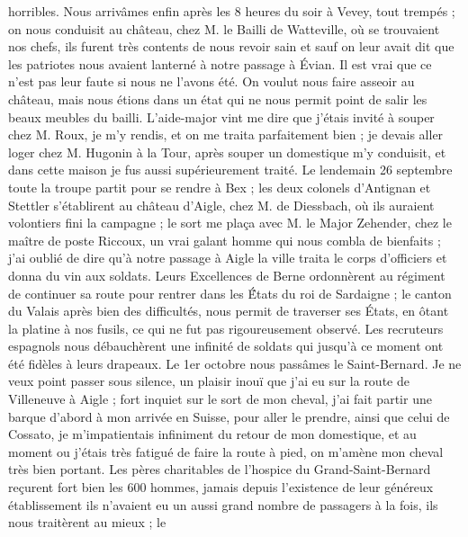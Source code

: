 \documentclass[12pt]{article}
\begin{document}
 horribles. Nous arrivâmes enfin après les 8 heures du
soir à Vevey, tout trempés ; on nous conduisit au château, chez M. le Bailli de Watteville, où se
trouvaient nos chefs, ils furent très contents de nous revoir sain et sauf on leur avait dit que les
patriotes nous avaient lanterné à notre passage à Évian. Il est vrai que ce n’est pas leur faute si
nous ne l’avons été. On voulut nous faire asseoir au château, mais nous étions dans un état qui ne
nous permit point de salir les beaux meubles du bailli. L’aide-major vint me dire que j’étais invité
à souper chez M. Roux, je m’y rendis, et on me traita parfaitement bien ; je devais aller loger chez
M. Hugonin à la Tour, après souper un domestique m’y conduisit, et dans cette maison je fus aussi
supérieurement traité. Le lendemain 26 septembre toute la troupe partit pour se rendre à Bex ; les
deux colonels d’Antignan et Stettler s’établirent au château d’Aigle, chez M. de Diessbach, où ils
auraient volontiers fini la campagne ; le sort me plaça avec M. le Major Zehender, chez le maître de
poste Riccoux, un vrai galant homme qui nous combla de bienfaits ; j’ai oublié de dire qu’à notre
passage à Aigle la ville traita le corps d’officiers et donna du vin aux soldats. Leurs Excellences
de Berne ordonnèrent au régiment de continuer sa route pour rentrer dans les É́tats du roi de
Sardaigne ; le canton du Valais après bien des difficultés, nous permit de traverser ses États, en
ôtant la platine à nos fusils, ce qui ne fut pas rigoureusement observé. Les recruteurs espagnols
nous débauchèrent une infinité de soldats qui jusqu’à ce moment ont été fidèles à leurs drapeaux. Le
1er octobre nous passâmes le Saint-Bernard. Je ne veux point passer sous silence, un plaisir inouï
que j’ai eu sur la route de Villeneuve à Aigle ; fort inquiet sur le sort de mon cheval, j’ai fait
partir une barque d’abord à mon arrivée en Suisse, pour aller le prendre, ainsi que celui de
Cossato, je m’impatientais infiniment du retour de mon domestique, et au moment ou j’étais très
fatigué de faire la route à pied, on m’amène mon cheval très bien portant. Les pères charitables de
l’hospice du Grand-Saint-Bernard reçurent fort bien les 600 hommes, jamais depuis l’existence de
leur généreux établissement ils n’avaient eu un aussi grand nombre de passagers à la fois, ils nous
traitèrent au mieux ; le
\end{document}
